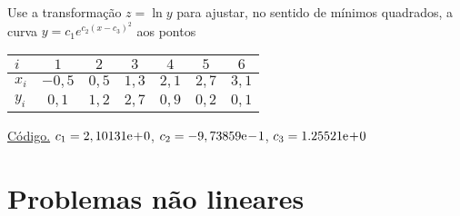 \begin{exer}\label{exer:mq_nlin0}
  Use a transformação $z = \ln y$ para ajustar, no sentido de mínimos quadrados, a curva $y = c_1e^{c_2(x-c_3)^2}$ aos pontos
  \begin{center}
    \begin{tabular}{l|cccccc}
      $i$ & $1$ & $2$ & $3$ & $4$ & $5$ & $6$ \\\hline
      $x_i$ & $-0,5$ & $0,5$ & $1,3$ & $2,1$ & $2,7$ & $3,1$ \\
      $y_i$ & $0,1$ & $1,2$ & $2,7$ & $0,9$ & $0,2$ & $0,1$ \\\hline
    \end{tabular}
  \end{center}
\end{exer}
\begin{resp}
  \ifisoctave 
  \href{https://github.com/phkonzen/notas/blob/master/src/MatematicaNumerica/cap_ajuste/dados/exer_mq_nlin0/exer_mq_nlin0.m}{Código.} 
  \fi
  $c_1 = 2,10131\mathrm{e}\!+\!0$, $c_2 = -9,73859\mathrm{e}\!-\!1$, $c_3 = 1.25521\mathrm{e}\!+\!0$
\end{resp}
   
\section{Problemas não lineares}\label{cap_ajuste_sec_prob_nlin}

